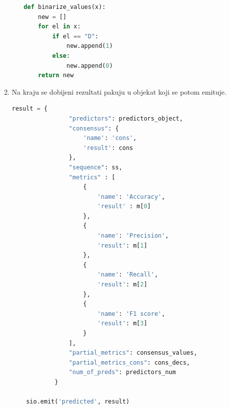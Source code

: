 \begin{enumerate}
\begin{itemize}
\begin{lstlisting}[language=Python]
def binarize_values(x):
    new = []
    for el in x:
        if el == "D":
            new.append(1)
        else:
            new.append(0)
    return new
\end{lstlisting}
\end{itemize}

\item Na kraju se dobijeni rezultati pakuju u objekat koji se potom emituje.

\begin{lstlisting}[language=Python]
result = {
                "predictors": predictors_object,
                "consensus": {
                    'name': 'cons',
                    'result': cons
                },
                "sequence": ss,
                "metrics" : [
                    {
                        'name': 'Accuracy',
                        'result' : m[0]
                    },
                    {
                        'name': 'Precision',
                        'result': m[1] 
                    },
                    {
                        'name': 'Recall',
                        'result': m[2] 
                    },
                    {
                        'name': 'F1 score',
                        'result': m[3] 
                    }
                ],
                "partial_metrics": consensus_values,
                "partial_metrics_cons": cons_decs,
                "num_of_preds": predictors_num
            }
            
    sio.emit('predicted', result)
\end{lstlisting}
\end{enumerate}

